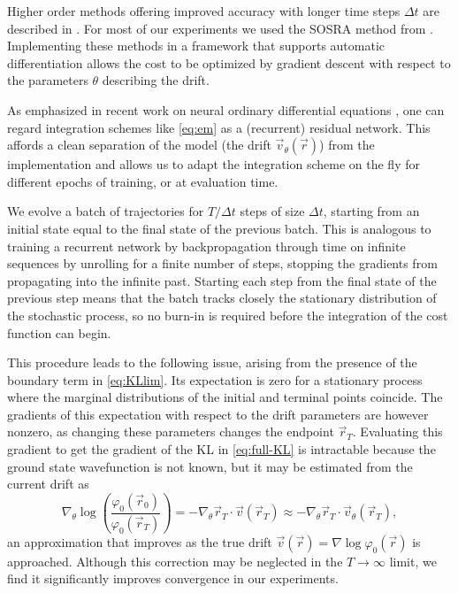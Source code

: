 \documentclass[12pt]{msml2020} %
\begin{document}
Higher order methods offering improved accuracy with longer time steps $\Delta t$ are described in \cite{Kloeden:2013aa}. For most of our experiments we used the SOSRA method from \cite{Rackauckas:2018aa}. Implementing these methods in a framework that supports automatic differentiation allows the cost to be optimized by gradient descent with respect to the parameters $\theta$ describing the drift.

As emphasized in recent work on neural ordinary differential equations \cite{Chen:2018aa}, one can regard integration schemes like \eqref{eq:em} as a (recurrent) residual network. This affords a clean separation of the model (the drift $\vec{v}_\theta(\vec{r})$) from the implementation and allows 
us to adapt the integration scheme on the fly for different epochs of training, or at evaluation time.

We evolve a batch of trajectories for $T/\Delta t$ steps of size $\Delta t$, starting from an initial state equal to the final state of the previous batch. This is analogous to training a recurrent network by backpropagation through time on infinite sequences by unrolling for a finite number of steps, stopping the gradients from propagating into the infinite past. Starting each step from the final state of the previous step means that the batch tracks closely the stationary distribution of the stochastic process, so no burn-in is required before the integration of the cost function can begin. 

This procedure leads to the following issue, arising from the presence of the boundary term in \eqref{eq:KLlim}. Its expectation is zero for a stationary process where the marginal distributions of the initial and terminal points coincide. The gradients of this expectation with respect to the drift parameters are however nonzero, as changing these parameters changes the endpoint $\vec{r}_T$. Evaluating this gradient to get the gradient of the KL in \eqref{eq:full-KL} is intractable because the ground state wavefunction is not known, but it may be estimated from the current drift as
%
\begin{equation}\label{drift-correct}
\nabla_\theta \log\left(\frac{\varphi_0(\vec{r}_0)}{\varphi_0(\vec{r}_T)}\right) = -\nabla_\theta \vec{r}_T \cdot \vec{v}(\vec{r}_T)\approx -\nabla_\theta \vec{r}_T \cdot \vec{v}_\theta(\vec{r}_T),
\end{equation}
%
an approximation that improves as the true drift $\vec{v}(\vec{r})=\nabla\log\varphi_0(\vec{r})$ is approached. Although this correction may be neglected in the $T\to\infty$ limit, we find it significantly improves convergence in our experiments.
\end{document}
